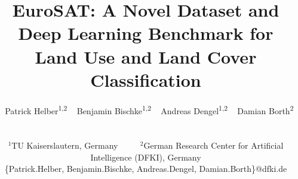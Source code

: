 \documentclass[journal]{IEEEtran}
\begin{document}
%
\title{EuroSAT: A Novel Dataset and Deep Learning Benchmark for Land Use and Land Cover Classification}
%
%
%


\author{
   \fontsize{12pt}{0}\selectfont 
        ~ Patrick Helber\textsuperscript{1,2}
        ~ Benjamin Bischke\textsuperscript{1,2}
        ~ Andreas Dengel\textsuperscript{1,2} 
        ~ Damian Borth\textsuperscript{2} ~  \\ ~ \\
    \fontsize{10pt}{0}\selectfont 
    \hspace{-0.25em}
    $^1$TU Kaiserslautern, Germany ~~~~ $^2$German Research Center for Artificial Intelligence (DFKI), Germany  \\ 
    \fontsize{10pt}{0}\selectfont 
     \{Patrick.Helber, Benjamin.Bischke, Andreas.Dengel, Damian.Borth\}@dfki.de  \\ 
}


\end{document}
